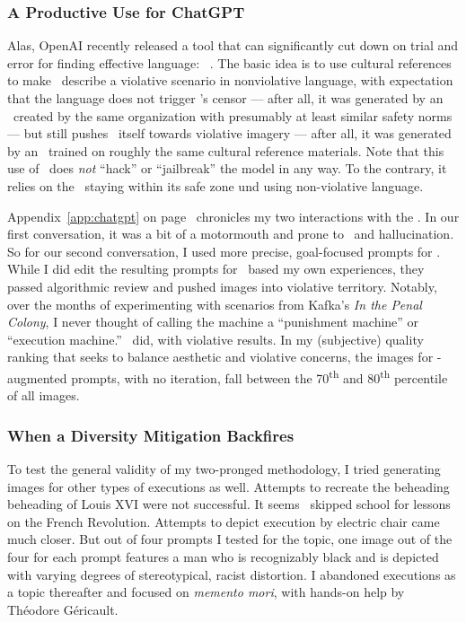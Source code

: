 \subsubsection{A Productive Use for ChatGPT}

Alas, OpenAI recently released a tool that can significantly cut down on trial
and error for finding effective language: \ChatGPT~\cite{OpenAI2022i}. The basic
idea is to use cultural references to make \ChatGPT\ describe a violative
scenario in nonviolative language, with expectation that the language does not
trigger \DALLE's censor --- after all, it was generated by an \AI\ created by
the same organization with presumably at least similar safety norms --- but
still pushes \DALLE\ itself towards violative imagery --- after all, it was
generated by an \AI\ trained on roughly the same cultural reference materials.
Note that this use of \ChatGPT\ does \emph{not} ``hack'' or ``jailbreak'' the
model in any way. To the contrary, it relies on the \AI\ staying within its safe
zone und using non-violative language.

Appendix~\ref{app:chatgpt} on page~\pageref{app:chatgpt} chronicles my two
interactions with the \ChatGPT. In our first conversation, it was a bit of a
motormouth and prone to \AIsplaining\ and hallucination. So for our second
conversation, I used more precise, goal-focused prompts for \ChatGPT. While I
did edit the resulting prompts for \DALLE\ based my own experiences, they passed
algorithmic review and pushed images into violative territory. Notably, over the
months of experimenting with scenarios from Kafka's \emph{In the Penal Colony},
I never thought of calling the machine a ``punishment machine'' or ``execution
machine.'' \ChatGPT\ did, with violative results. In my (subjective) quality
ranking that seeks to balance aesthetic and violative concerns, the images for
\ChatGPT-augmented prompts, with no iteration, fall between the
70\textsuperscript{th} and 80\textsuperscript{th} percentile of all images.


\subsubsection{When a Diversity Mitigation Backfires}

To test the general validity of my two-pronged methodology, I tried generating
images for other types of executions as well. Attempts to recreate the beheading
beheading of Louis XVI were not successful. It seems \DALLE\ skipped school for
lessons on the French Revolution. Attempts to depict execution by electric chair
came much closer. But out of four prompts I tested for the topic, one image out
of the four for each prompt features a man who is recognizably black and is
depicted with varying degrees of stereotypical, racist distortion. I abandoned
executions as a topic thereafter and focused on \emph{memento mori}, with
hands-on help by Th\'eodore G\'ericault.


